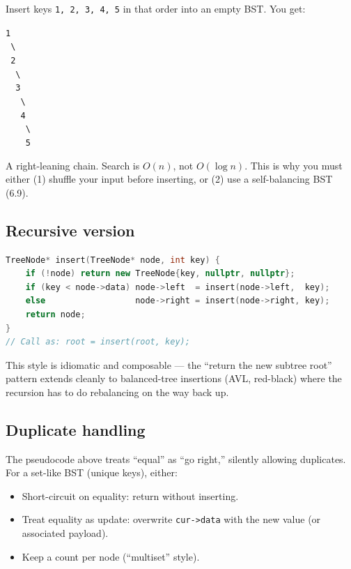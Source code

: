 \documentclass[11pt]{article}
\begin{document}
\begin{warnbox}
Insert keys \texttt{1, 2, 3, 4, 5} in that order into an empty
BST. You get:
\begin{center}
\texttt{1}\\
\texttt{\ \textbackslash{}}\\
\texttt{\ 2}\\
\texttt{\ \ \textbackslash{}}\\
\texttt{\ \ 3}\\
\texttt{\ \ \ \textbackslash{}}\\
\texttt{\ \ \ 4}\\
\texttt{\ \ \ \ \textbackslash{}}\\
\texttt{\ \ \ \ 5}
\end{center}
A right-leaning chain. Search is $O(n)$, not $O(\log n)$. This
is why you must either (1) shuffle your input before inserting,
or (2) use a self-balancing BST (6.9).
\end{warnbox}

\subsection*{Recursive version}

\begin{examplebox}
\begin{lstlisting}[language=C++,basicstyle=\ttfamily\small,frame=single]
TreeNode* insert(TreeNode* node, int key) {
    if (!node) return new TreeNode{key, nullptr, nullptr};
    if (key < node->data) node->left  = insert(node->left,  key);
    else                  node->right = insert(node->right, key);
    return node;
}
// Call as: root = insert(root, key);
\end{lstlisting}
\end{examplebox}

This style is idiomatic and composable --- the ``return the new
subtree root'' pattern extends cleanly to balanced-tree
insertions (AVL, red-black) where the recursion has to do
rebalancing on the way back up.

\subsection*{Duplicate handling}

The pseudocode above treats ``equal'' as ``go right,'' silently
allowing duplicates. For a set-like BST (unique keys), either:

\begin{itemize}[leftmargin=*]
    \item Short-circuit on equality: return without inserting.
    \item Treat equality as update: overwrite
          \texttt{cur->data} with the new value (or associated
          payload).
    \item Keep a count per node (``multiset'' style).
\end{itemize}
\end{document}
